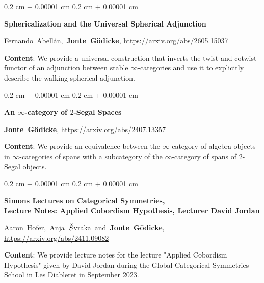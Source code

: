 \documentclass[10pt, letterpaper]{article}
\newenvironment{onecolentry}{
    \begin{adjustwidth}{
        0.2 cm + 0.00001 cm
    }{
        0.2 cm + 0.00001 cm
    }
}{
    \end{adjustwidth}
} %
\begin{document}
\begin{onecolentry}
                \textbf{Sphericalization and the Universal Spherical Adjunction}

                \vspace{0.10 cm}

                \mbox{Fernando Abell\'an, \textbf{Jonte Gödicke}}, \url{https://arxiv.org/abs/2605.15037}

                \vspace{0.10cm}
                
                \textbf{Content}: We provide a universal construction that inverts the twist and cotwist functor of an adjunction between stable $\infty$-categories and use it to explicitly describe the walking spherical adjunction.
                \vspace{0.10 cm}

\end{onecolentry}
\vspace{0.2cm}


 \begin{onecolentry}
                \textbf{An $\infty$-category of $2$-Segal Spaces}

                \vspace{0.10 cm}

                \mbox{\textbf{Jonte Gödicke}}, \url{https://arxiv.org/abs/2407.13357}

                \vspace{0.10cm}
                
                \textbf{Content}: We provide an equivalence between the $\infty$-category of algebra objects in $\infty$-categories of spans with a subcategory of the $\infty$-category of spans of $2$-Segal objects.
                \vspace{0.10 cm}

\end{onecolentry}
\vspace{0.2cm}

\begin{onecolentry}
                \textbf{Simons Lectures on Categorical Symmetries,\\
                Lecture Notes: Applied Cobordism Hypothesis, Lecturer David Jordan}

                \vspace{0.10 cm}

                \mbox{Aaron Hofer, Anja $\Check{S}$vraka and \textbf{Jonte Gödicke}}, \url{https://arxiv.org/abs/2411.09082}
                
                \vspace{0.10cm}
                
                \textbf{Content}: We provide lecture notes for the lecture "Applied Cobordism Hypothesis" given by David Jordan during the Global Categorical Symmetries School in Les Diableret in September 2023.
                \vspace{0.10 cm}




\end{onecolentry}
\end{document}
